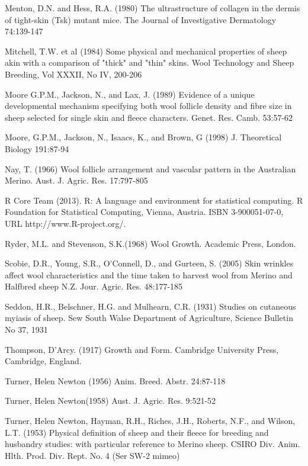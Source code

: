 \documentclass[titlepage]{article}  %
\begin{document}
\begin{thebibliography}{99}
Menton, D.N. and Hess, R.A. (1980) The ultrastructure of collagen in the dermis of tight-skin (Tsk) mutant mice. The Journal of Investigative Dermatology 74:139-147

Mitchell, T.W. et al (1984) Some physical and mechanical properties of sheep akin with a comparison of "thick" and "thin" skins. Wool Technology and Sheep Breeding, Vol XXXII, No IV, 200-206

Moore G.P.M., Jackson, N., and Lax, J. (1989) Evidence of a unique developmental mechanism specifying both wool follicle density and fibre size in sheep selected for single skin and fleece characters. Genet. Res. Camb. 53:57-62

Moore, G.P.M., Jackson, N., Isaacs, K., and Brown, G (1998) J. Theoretical Biology 191:87-94

Nay, T. (1966) Wool follicle arrangement and vascular pattern in the Australian Merino. Aust. J. Agric. Res. 17:797-805

R Core Team (2013). R: A language and environment for statistical
  computing. R Foundation for Statistical Computing, Vienna, Austria.
  ISBN 3-900051-07-0, URL http://www.R-project.org/.

Ryder, M.L. and Stevenson, S.K.(1968) Wool Growth. Academic Press, London.

Scobie, D.R., Young, S.R., O'Connell, D., and Gurteen, S. (2005) Skin wrinkles affect wool characteristics and the time taken to harvest wool from Merino and Halfbred sheep N.Z. Jour. Agric. Res. 48:177-185

Seddon, H.R., Belschner, H.G. and Mulhearn, C.R. (1931)  Studies on cutaneous myiasis of sheep. Sew South Walse Department of Agriculture, Science Bulletin No 37, 1931

Thompson, D'Arcy. (1917) Growth and Form. Cambridge University Press, Cambridge, England.

Turner, Helen Newton (1956) Anim. Breed. Abstr. 24:87-118

Turner, Helen Newton(1958) Aust. J. Agric. Res. 9:521-52

Turner, Helen Newton, Hayman, R.H., Riches, J.H., Roberts, N.F., and Wilson, L.T. (1953) Physical definition of sheep and their fleece for breeding and husbandry studies: with particular reference to Merino sheep. CSIRO Div. Anim. Hlth. Prod. Div. Rept. No. 4 (Ser SW-2 mimeo)


\end{thebibliography}
\end{document}
